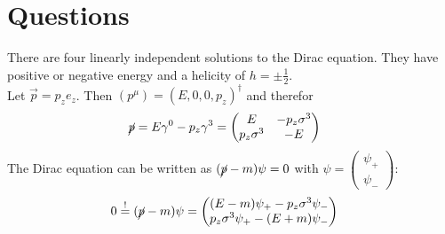 \documentclass[english, parskip=full]{scrartcl}
\title{\titel}
\author{\autor}
\date{\today}
\begin{document}
\maketitle  %

\section{Questions}
There are four linearly independent solutions to the Dirac equation. They have positive or negative energy and a helicity of $h=\pm\frac{1}{2}$.\\
Let $\vec{p}=p_ze_z$. Then $(p^\mu)=(E,0,0,p_z)^\dagger$ and therefor
\begin{align*}
\cancel{p}&=E\gamma^0-p_z\gamma^3=\begin{pmatrix}
E&-p_z\sigma^3 \\ p_z\sigma^3 & -E
\end{pmatrix}
\end{align*}
The Dirac equation can be written as $(\cancel{p}-m)\psi=0$ with $\psi=\begin{pmatrix}
\psi_+\\ \psi_-
\end{pmatrix} $:
\begin{align*}
0&\overset{!}{=}(\cancel{p}-m)\psi =\begin{pmatrix}
(E-m)\psi_+-p_z\sigma^3\psi_- \\
p_z\sigma^3\psi_+-(E+m)\psi_-
\end{pmatrix}
\end{align*}
\end{document}

